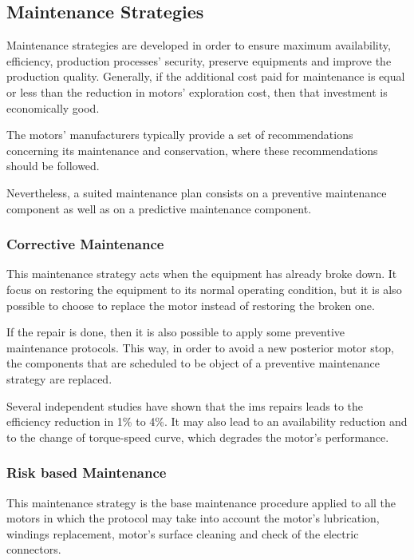 \subsection{Maintenance Strategies}
\label{subsec:maintenance}

Maintenance strategies are developed in order to ensure maximum availability, efficiency, production processes' security, preserve equipments and improve the production quality. Generally, if the additional cost paid for maintenance is equal or less than the reduction in motors' exploration cost, then that investment is economically good.

The motors' manufacturers typically provide a set of recommendations concerning its maintenance and conservation, where these recommendations should be followed.

Nevertheless, a suited maintenance plan consists on a preventive maintenance component as well as on a predictive maintenance component.

\subsubsection{Corrective Maintenance}
\label{subsubsec:corrective_maintenance}

This maintenance strategy acts when the equipment has already broke down. It focus on restoring the equipment to its normal operating condition, but it is also possible to choose to replace the motor instead of restoring the broken one. 

If the repair is done, then it is also possible to apply some preventive maintenance protocols. This way, in order to avoid a new posterior motor stop, the components that are scheduled to be object of a preventive maintenance strategy are replaced.

Several independent studies have shown that the \acrshort{ims} repairs leads to the efficiency reduction in 1\% to 4\%. It may also lead to an availability reduction and to the change of torque-speed curve, which degrades the motor's performance.


\subsubsection{Risk based Maintenance}
\label{subsubsec:risk_based_maintenance}

This maintenance strategy is the base maintenance procedure applied to all the motors in which the protocol may take into account the motor's lubrication, windings replacement, motor's surface cleaning and check of the electric connectors.

